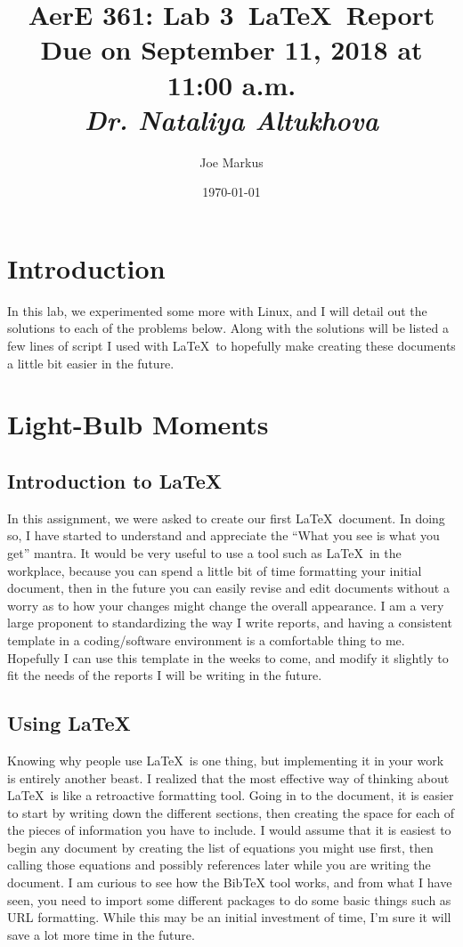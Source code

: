 \documentclass{article}
\title{
    \vspace{2in}
    \textmd{\textbf{AerE 361: Lab 3\ \LaTeX\ Report}}\\
    \normalsize\vspace{0.1in}\small{Due on September 11, 2018 at 11:00 a.m.}\\
    \vspace{0.1in}\large{\textit{Dr. Nataliya Altukhova}}
    \vspace{3in}
}
\author{Joe Markus}
\date{\today}
\begin{document}
\maketitle
\newpage

\section{Introduction}
In this lab, we experimented some more with Linux, and I will detail out the solutions to each of the problems below. Along with the solutions will be listed a few lines of script I used with \LaTeX\ to hopefully make creating these documents a little bit easier in the future. 

\section{Light-Bulb Moments}
\subsection{Introduction to \LaTeX}
In this assignment, we were asked to create our first \LaTeX\ document. In doing so, I have started to understand and appreciate the ``What you see is what you get'' mantra. It would be very useful to use a tool such as \LaTeX\ in the workplace, because you can spend a little bit of time formatting your initial document, then in the future you can easily revise and edit documents without a worry as to how your changes might change the overall appearance. I am a very large proponent to standardizing the way I write reports, and having a consistent template in a coding/software environment is a comfortable thing to me. Hopefully I can use this template in the weeks to come, and modify it slightly to fit the needs of the reports I will be writing in the future.

\subsection{Using \LaTeX}
Knowing why people use \LaTeX\ is one thing, but implementing it in your work is entirely another beast. I realized that the most effective way of thinking about \LaTeX\ is like a retroactive formatting tool. Going in to the document, it is easier to start by writing down the different sections, then creating the space for each of the pieces of information you have to include. I would assume that it is easiest to begin any document by creating the list of equations you might use first, then calling those equations and possibly references later while you are writing the document. I am curious to see how the BibTeX tool works, and from what I have seen, you need to import some different packages to do some basic things such as URL formatting. While this may be an initial investment of time, I'm sure it will save a lot more time in the future. 
\end{document}
